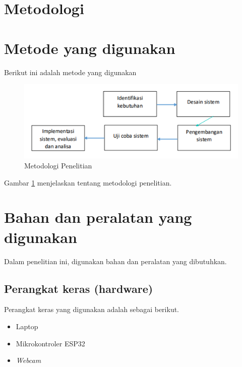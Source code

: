 \section{Metodologi}
\label{sec:metodologi}


\section{Metode yang digunakan}

Berikut ini adalah metode yang digunakan

\begin{figure}  \centering
  \includegraphics[scale=0.45]{gambar/Screenshot 2023-06-10 193529.png}
  \caption{Metodologi Penelitian}
  \label{fig:Metodologi}
\end{figure}

Gambar \ref{fig:Metodologi} menjelaskan tentang metodologi penelitian.

\section{Bahan dan peralatan yang digunakan}
Dalam penelitian ini, digunakan bahan dan peralatan yang dibutuhkan.
\subsection {Perangkat keras (hardware)}
Perangkat keras yang digunakan adalah sebagai berikut.
\begin{itemize}
 \item Laptop
 \item Mikrokontroler ESP32
 \item \emph{Webcam}
\end{itemize}

